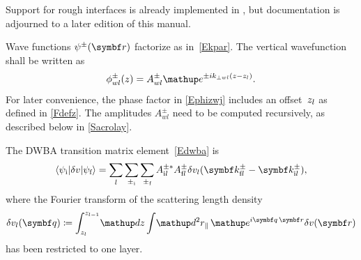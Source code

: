 Support for rough interfaces is already implemented in \BornAgain,
but documentation is adjourned to a later edition of this manual.

Wave functions $\psi^\pm(\r)$ factorize as in~\cref{Ekpar}.
The vertical wavefunction shall be written as
\begin{equation}\label{Ephizwj}
  \phi^\pm_{w\il}(z)=A^\pm_{w\il}\e^{\pm ik_{\perp w\il}(z-z_\il)}.
\end{equation}
%
For later convenience,
the phase factor in \cref{Ephizwj} includes an offset~$z_l$
as defined in \cref{Fdefz}.
%
%
%
The amplitudes $A^\pm_{wl}$ need to be computed recursively,
as described below in \cref{Sacrolay}.

The DWBA transition matrix element~\cref{Edwba} is
%
\begin{equation}\label{Edwba_ml0}
  \bra \psi_\ti|\delta v|\psi_\tf\ket
  = \sum_{\il} \sum_{\pm_\ti} \sum_{\pm_\tf}
    A^{\pm *}_{\ti \il} A^\pm_{\tf \il}
     \delta v_\il(\k^\pm_{\tf \il}-\k^\pm_{\ti \il}),
\end{equation}
where the Fourier transform of the scattering length density
\begin{equation}\label{Echij}
  \delta v_\il(\v{q})
  \coloneqq  \int_{z_\il}^{z_{\il-1}}\!\d z \int\!\d^2r_\plll\, \e^{i\v{q}\,\r}\delta v(\r)
\end{equation}
%
has been restricted to one layer.

